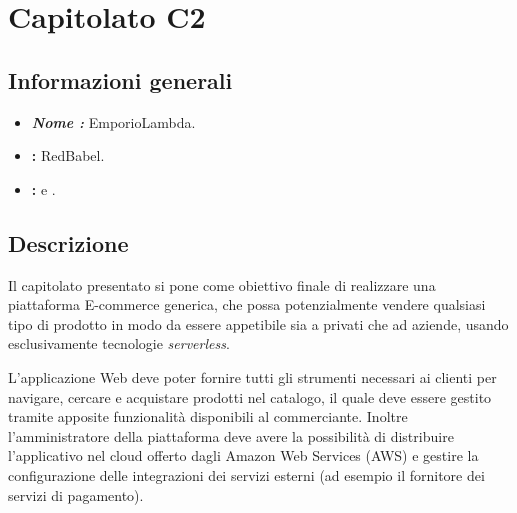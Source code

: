 \section{Capitolato C2}

\subsection{Informazioni generali}{
\begin{itemize}
\item \textbf{\emph{Nome :}} EmporioLambda.
\item \textbf{\commitProg:} RedBabel.
\item \textbf{\proponProg:} \VT{} e \CR.
\end{itemize}
}

\subsection{Descrizione}{
Il capitolato presentato si pone come obiettivo finale di realizzare una piattaforma E-commerce generica, che possa potenzialmente vendere qualsiasi tipo di prodotto in modo da essere appetibile sia a privati che ad aziende, usando esclusivamente tecnologie \textit{serverless}.

L'applicazione Web deve poter fornire tutti gli strumenti necessari ai clienti per navigare, cercare e acquistare prodotti nel catalogo, il quale deve essere gestito tramite apposite funzionalità disponibili al commerciante. Inoltre l'amministratore della piattaforma deve avere la possibilità di distribuire l'applicativo nel cloud offerto dagli Amazon Web Services (AWS) e gestire la configurazione delle integrazioni dei servizi esterni (ad esempio il fornitore dei servizi di pagamento).
}

